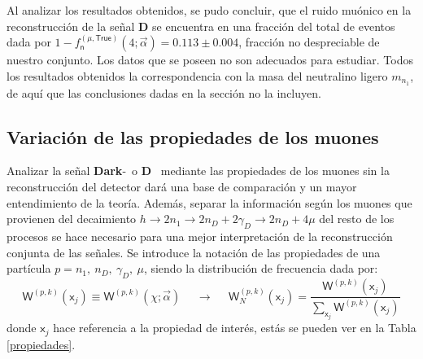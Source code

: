 Al analizar los resultados obtenidos, se pudo concluir, que el ruido muónico en la reconstrucción de la señal \MSSM\textbf{D} se encuentra en una fracción del total de eventos dada por $1 - f^{(\mu, \textsf{True})}_\textsf{n} (4; \vec{\alpha}) =  0.113 \pm 0.004 $, fracción no despreciable de nuestro conjunto. Los datos que se poseen no son adecuados para estudiar. Todos los resultados obtenidos  la correspondencia con la masa del neutralino ligero $m_{n_1}$, de aquí que las conclusiones dadas en la sección no la incluyen.

\subsection{Variación de las propiedades de los muones}

Analizar la señal \textbf{Dark}-\SUSY ~o \MSSM\textbf{D}~ mediante las propiedades de los muones sin la reconstrucción del detector dará una base de comparación y un mayor entendimiento de la teoría. Además, separar la información según los muones que provienen del decaimiento $h \rightarrow 2n_1 \rightarrow 2n_D + 2\gamma_D \rightarrow 2n_D + 4\mu$ del resto de los procesos se hace necesario para una mejor interpretación de la reconstrucción conjunta de las señales. Se introduce la notación de las propiedades de una partícula $p= n_1, ~n_D, ~\gamma_D, ~\mu$, siendo la distribución de frecuencia dada por:
\begin{equation}\label{Wpk}
\textsf{W}^{(p,k)} (\textsf{x}_j) \equiv \textsf{W}^{(p,k)} (\chi; \vec{\alpha}) ~~~~~~ \longrightarrow ~~~~~~ \textsf{W}^{(p,k)}_N (\textsf{x}_j) = \dfrac{\textsf{W}^{(p,k)} (\textsf{x}_j)}{ \sum\limits_{\textsf{x}_j} \textsf{W}^{(p,k)} (\textsf{x}_j)}
\end{equation}
donde $\textsf{x}_j$ hace referencia a la propiedad de interés, estás se pueden ver en la Tabla \ref{propiedades}.

